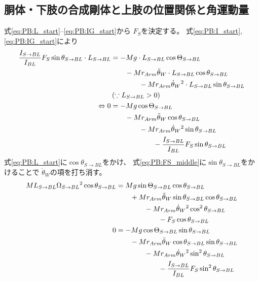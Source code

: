 \documentclass[a4paper,11pt]{jsarticle}
\begin{document}
\subsection{胴体・下肢の合成剛体と上肢の位置関係と角運動量}
式\ref{eq:PB:L_start}--\ref{eq:PB:IG_start}から
$F_S$を決定する。
式\ref{eq:PB:I_start}, \ref{eq:PB:IG_start}により
\begin{align}
  \frac{I_{S\rightarrow BL}}{I_{BL}}F_S\sin\theta_{S\rightarrow BL} \cdot L_{S\rightarrow BL} 
  &= -Mg \cdot L_{S\rightarrow BL}\cos\Theta_{S\rightarrow BL}
  \notag
  \\
  & \qquad - Mr_{Arm}\ddot{\theta}_W \cdot L_{S\rightarrow BL} \cos\theta_{S\rightarrow BL}
  \notag
  \\
  & \qquad \qquad - Mr_{Arm}\dot{\theta}_W{}^2 \cdot L_{S\rightarrow BL} \sin\theta_{S\rightarrow BL}
  \notag
  \\
  & \left( \because L_{S\rightarrow BL} > 0 \right)
  \notag
  \\
  \Leftrightarrow
  0
  &= -Mg \cos\Theta_{S\rightarrow BL}
  \notag
  \\
  & \qquad - Mr_{Arm}\ddot{\theta}_W \cos\theta_{S\rightarrow BL}
  \notag
  \\
  & \qquad \qquad - Mr_{Arm}\dot{\theta}_W{}^2 \sin\theta_{S\rightarrow BL}
  \notag
  \\
  & \qquad \qquad \qquad - \frac{I_{S\rightarrow BL}}{I_{BL}}F_S\sin\theta_{S\rightarrow BL}
  \label{eq:PB:FS_middle}
\end{align}
式\ref{eq:PB:L_start}に$\cos\theta_{S\rightarrow BL}$をかけ、
式\ref{eq:PB:FS_middle}に$\sin\theta_{S\rightarrow BL}$をかけることで
$\ddot\theta_{W}$の項を打ち消す。
\begin{align*}
  ML_{S\rightarrow BL}\Omega_{S\rightarrow BL}{}^2 \cos\theta_{S\rightarrow BL}
  &= Mg\sin\Theta_{S\rightarrow BL} \cos\theta_{S\rightarrow BL}
  \notag
  \\
  & \qquad + Mr_{Arm}\ddot{\theta}_W\sin\theta_{S\rightarrow BL}  \cos\theta_{S\rightarrow BL}
  \notag
  \\
  & \qquad \qquad - Mr_{Arm}\dot{\theta}_W{}^2\cos^2\theta_{S\rightarrow BL} 
  \notag
  \\
  & \qquad \qquad \qquad - F_S\cos\theta_{S\rightarrow BL}
  \\
  0 
  &= -Mg \cos\Theta_{S\rightarrow BL} \sin\theta_{S\rightarrow BL}
  \notag
  \\
  & \qquad - Mr_{Arm}\ddot{\theta}_W \cos\theta_{S\rightarrow BL} \sin\theta_{S\rightarrow BL}
  \notag
  \\
  & \qquad \qquad - Mr_{Arm}\dot{\theta}_W{}^2 \sin^2\theta_{S\rightarrow BL}
  \notag
  \\
  & \qquad \qquad \qquad - \frac{I_{S\rightarrow BL}}{I_{BL}}F_S\sin^2\theta_{S\rightarrow BL}
\end{align*}
\end{document}
